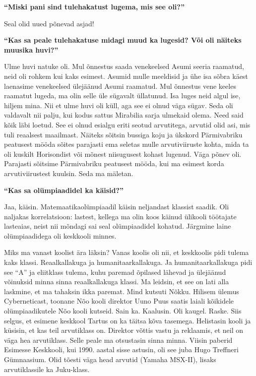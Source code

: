 \textbf{\enquote{Miski pani sind tulehakatust lugema, mis see oli?}}

Seal olid uued põnevad asjad!

\textbf{\enquote{Kas sa peale tulehakatuse midagi muud ka lugesid? Või oli
näiteks muusika huvi?}}

Ulme huvi natuke oli. Mul õnnestus saada venekeelsed Asumi seeria raamatud, neid
oli rohkem kui kaks esimest. Asumid mulle meeldisid ja ühe isa sõbra käest
laenasime venekeelsed ülejäänud Asumi raamatud. Mul õnnestus vene keeles
raamatut lugeda, ma olin selle üle sügavalt üllatunud. Isa luges neid algul
ise, hiljem mina. Nii et ulme huvi oli küll, aga see ei olnud väga sügav. Seda
oli valdavalt nii palju, kui kodus sattus Mirabilia sarja ulmekaid olema. Need
said kõik läbi loetud. See ei olnud esialgu eriti seotud arvutitega, arvutid
olid asi, mis tuli reaalsest maailmast. Näiteks sõitsin bussiga koju ja ükskord
Pärmivabriku peatusest mööda sõites parajasti ema seletas mulle arvutiviiruste
kohta, mida ta oli kuskilt Horisondist või mõnest niisugusest kohast lugenud.
Väga põnev oli. Parajasti sõitsime Pärmivabriku peatusest mööda, kui ma esimest
korda arvutiviirustest kuulsin. Seda ma mäletan.

\textbf{\enquote{Kas sa olümpiaadidel ka käisid?}}

Jaa, käisin. Matemaatikaolümpiaadil käisin neljandast klassist saadik. Oli
naljakas korrelatsioon: lastest, kellega ma olin koos käinud ülikooli töötajate
lasteaias, neist nii mõndagi sai seal olümpiaadidel kohatud. Järgmine laine
olümpiaadidega oli keskkooli minnes.

Miks ma vanast koolist ära läksin? Vanas koolis oli nii, et keskkoolis pidi
tulema kaks klassi. Reaalkallakuga ja humanitaarkallakuga. Ja
humanitaarkallakuga pidi see \enquote{A} ja eliitklass tulema, kuhu paremad
õpilased lähevad ja ülejäänud võinuksid minna sinna reaalkallakuga klassi. Ma
leidsin, et see on lati alla laskmine, et ma tahaksin ikka paremat. Mind
kutsuti Nõkku. Hilisem ülemus
Cyberneticast, toonane Nõo kooli direktor Uuno
Puus saatis laiali kõikidele olümpiaadikutele Nõo kooli
kutseid. Sain ka. Kaalusin. Oli kaugel. Raske. Siis selgus, et esimene keskkool
Tartus on ka täitsa kõva tasemega. Helistasin
kooli ja küsisin, et kas teil arvutiklass on. Direktor võttis vastu ja
reklaamis, et neil on väga hea arvutiklass. Selle peale ma otsustasin sinna
minna. Viisin paberid Esimesse Keskkooli, kui 1990. aastal sisse astusin, oli
see juba Hugo Treffneri Gümnaasium. Olid tõesti väga head arvutid (Yamaha
MSX-II), lisaks arvutiklassile ka Juku-klass.

